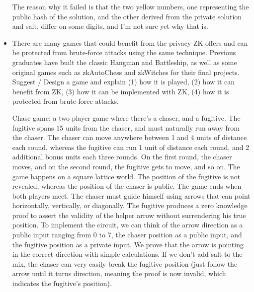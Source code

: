 \documentclass{article}
\begin{document}
\begin{itemize}
    The reason why it failed is that the two yellow numbers, one representing the public hash of the solution, and the other derived from the private solution and salt, differ on some digits, and I'm not sure yet why that is.
    \item There are many games that could benefit from the privacy ZK offers and can be protected from brute-force attacks using the same technique. Previous graduates have built the classic Hangman and Battleship, as well as some original games such as zkAutoChess and zkWitches for their final projects. Suggest / Design a game and explain (1) how it is played, (2) how it can benefit from ZK, (3) how it can be implemented with ZK, (4) how it is protected from brute-force attacks. \par Chase game: a two player game where there's a chaser, and a fugitive. The fugitive spans 15 units from the chaser, and must naturally run away from the chaser. The chaser can move anywhere between 1 and 4 units of distance each round, whereas the fugitive can run 1 unit of distance each round, and 2 additional bonus units each three rounds. On the first round, the chaser moves, and on the second round, the fugitive gets to move, and so on. The game happens on a square lattice world. The position of the fugitive is not revealed, whereas the position of the chaser is public. The game ends when both players meet. The chaser must guide himself using arrows that can point horizontally, vertically, or diagonally. The fugitive produces a zero knowledge proof to assert the validity of the helper arrow without surrendering his true position. To implement the circuit, we can think of the arrow direction as a public input ranging from 0 to 7, the chaser position as a public input, and the fugitive position as a private input. We prove that the arrow is pointing in the correct direction with simple calculations. If we don't add salt to the mix, the chaser can very easily break the fugitive position (just follow the arrow until it turns direction, meaning the proof is now invalid, which indicates the fugitive's position).
\end{itemize}
\end{document}
